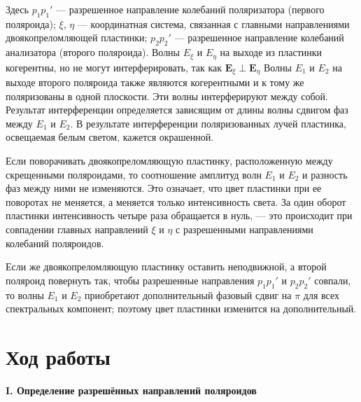 \documentclass[a4paper,12pt]{article} %
\begin{document}
	Здесь $p_1 p_1'$ — разрешенное направление колебаний поляризатора (первого поляроида); $\xi$, $\eta$ — координатная система, связанная с главными направлениями двоякопреломляющей пластинки; $p_2 p_2'$ — разрешенное направление колебаний анализатора (второго поляроида). Волны $E_\xi$ и $E_\eta$ на выходе из пластинки когерентны, но не могут интерферировать, так как $\boldsymbol{E}_\xi \perp \boldsymbol{E}_\eta$ Волны $E_1$ и $E_2$ на выходе второго поляроида также являются когерентными и к тому же поляризованы в одной плоскости. Эти волны интерферируют между собой. Результат интерференции определяется зависящим от длины волны сдвигом фаз между $E_1$ и $E_2$. В результате интерференции поляризованных лучей пластинка, освещаемая белым светом, кажется окрашенной.
	
	
	Если поворачивать двоякопреломляющую пластинку, расположенную между скрещенными поляроидами, то соотношение амплитуд волн $E_1$ и $E_2$ и разность фаз между ними не изменяются. Это означает, что цвет пластинки при ее поворотах не меняется, а меняется только интенсивность света. За один оборот пластинки интенсивность четыре раза обращается в нуль, — это происходит при совпадении главных направлений $\xi$ и $\eta$ с разрешенными направлениями колебаний поляроидов.
	
	Если же двоякопреломляющую пластинку оставить неподвижной, а второй поляроид повернуть так, чтобы разрешенные направления $p_1 p_1'$ и $p_2 p_2'$ совпали, то волны $E_1$ и $E_2$ приобретают дополнительный фазовый сдвиг на $\pi$ для всех спектральных компонент; поэтому цвет пластинки изменится на дополнительный.
	
	\newpage
	\section*{Ход работы}
	
	\begin{center}
		\textbf{I. Определение разрешённых направлений поляроидов}
	\end{center}
\end{document}
